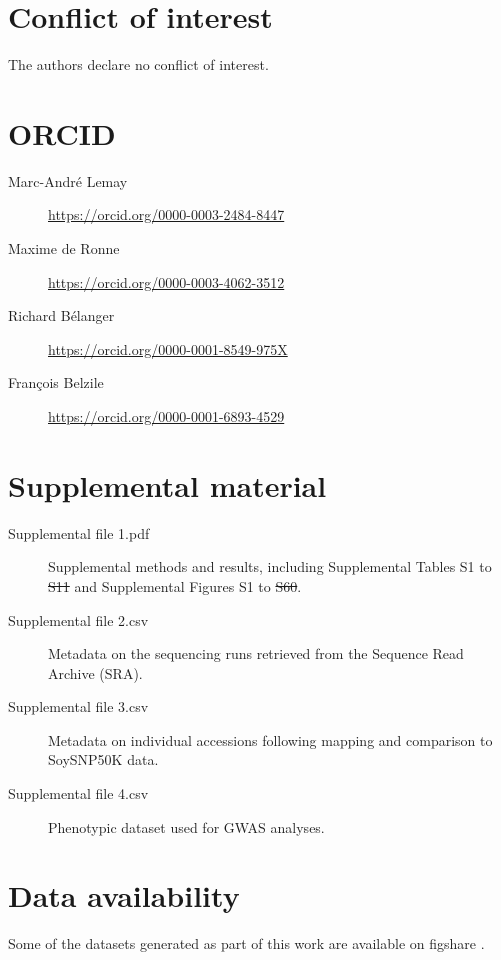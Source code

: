 \documentclass{article}
\providecommand{\DIFaddtex}[1]{{\protect\color{blue}\uwave{#1}}} %
\providecommand{\DIFdeltex}[1]{{\protect\color{red}\sout{#1}}}                      %
\providecommand{\DIFaddbegin}{} %
\providecommand{\DIFaddend}{} %
\providecommand{\DIFdelbegin}{} %
\providecommand{\DIFdelend}{} %
\providecommand{\DIFadd}[1]{\texorpdfstring{\DIFaddtex{#1}}{#1}} %
\providecommand{\DIFdel}[1]{\texorpdfstring{\DIFdeltex{#1}}{}} %
\newcommand{\DIFscaledelfig}{0.5}
\newlength{\DIFdelgraphicswidth} %
\newlength{\DIFdelgraphicsheight} %
\newcommand{\DIFaddincludegraphics}[2][]{{\color{blue}\fbox{\DIFOincludegraphics[#1]{#2}}}} %
\newcommand{\DIFdelincludegraphics}[2][]{%
\sbox{\DIFdelgraphicsbox}{\DIFOincludegraphics[#1]{#2}}%
\settoboxwidth{\DIFdelgraphicswidth}{\DIFdelgraphicsbox} %
\settoboxtotalheight{\DIFdelgraphicsheight}{\DIFdelgraphicsbox} %
\scalebox{\DIFscaledelfig}{%
\parbox[b]{\DIFdelgraphicswidth}{\usebox{\DIFdelgraphicsbox}\\[-\baselineskip] \rule{\DIFdelgraphicswidth}{0em}}\llap{\resizebox{\DIFdelgraphicswidth}{\DIFdelgraphicsheight}{%
\setlength{\unitlength}{\DIFdelgraphicswidth}%
\begin{picture}(1,1)%
\thicklines\linethickness{2pt} %
{\color[rgb]{1,0,0}\put(0,0){\framebox(1,1){}}}%
{\color[rgb]{1,0,0}\put(0,0){\line( 1,1){1}}}%
{\color[rgb]{1,0,0}\put(0,1){\line(1,-1){1}}}%
\end{picture}%
}\hspace*{3pt}}} %
} %
\DeclareRobustCommand{\DIFaddbegin}{\DIFOaddbegin \let\includegraphics\DIFaddincludegraphics} %
\DeclareRobustCommand{\DIFaddend}{\DIFOaddend \let\includegraphics\DIFOincludegraphics} %
\DeclareRobustCommand{\DIFdelbegin}{\DIFOdelbegin \let\includegraphics\DIFdelincludegraphics} %
\DeclareRobustCommand{\DIFdelend}{\DIFOaddend \let\includegraphics\DIFOincludegraphics} %
\begin{document}
\section*{Conflict of interest}
The authors declare no conflict of interest.

\section*{ORCID}

\begin{description}
	\item[Marc-André Lemay] \url{https://orcid.org/0000-0003-2484-8447}
	\item[Maxime de Ronne] \url{https://orcid.org/0000-0003-4062-3512}
	\item[Richard Bélanger] \url{https://orcid.org/0000-0001-8549-975X}
	\item[François Belzile] \url{https://orcid.org/0000-0001-6893-4529}
\end{description}

\section*{Supplemental material}

\begin{description}
	\item[Supplemental file 1.pdf] Supplemental methods and results, including
		Supplemental Tables S1 to \DIFdelbegin \DIFdel{S11 }\DIFdelend \DIFaddbegin \DIFadd{S12 }\DIFaddend and Supplemental Figures S1 to
		\DIFdelbegin \DIFdel{S60}\DIFdelend \DIFaddbegin \DIFadd{S61}\DIFaddend .

	\item[Supplemental file 2.csv] Metadata on the sequencing runs retrieved
		from the Sequence Read Archive (SRA).

	\item[Supplemental file 3.csv] Metadata on individual accessions following
		mapping and comparison to SoySNP50K data.

	\item[Supplemental file 4.csv] Phenotypic dataset used for GWAS analyses.
\end{description}

\section*{Data availability}

Some of the datasets generated as part of this work are available on figshare
.
\end{document}
